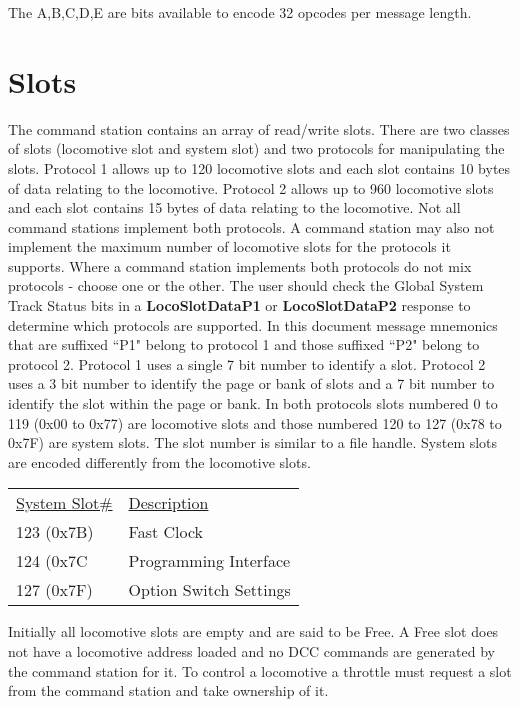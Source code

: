 The A,B,C,D,E are bits available to encode 32 opcodes per message length.

\section{Slots}

The command station contains an array of read/write slots. There are two classes of slots (\gls{locomotive slot} and \gls{system slot}) and two protocols for manipulating the slots. Protocol 1 allows up to 120 locomotive slots and each slot contains 10 bytes of data relating to the locomotive. Protocol 2 allows up to 960 locomotive slots and each slot contains 15 bytes of data relating to the locomotive. Not all command stations implement both protocols. A command station may also not implement the maximum number of locomotive slots for the protocols it supports. Where a command station implements both protocols do not mix protocols - choose one or the other. The user should check the \gls{Global System Track Status} bits in a \textbf{LocoSlotDataP1} or \textbf{LocoSlotDataP2} response to determine which protocols are supported. In this document message mnemonics that are suffixed ``P1" belong to protocol 1 and those suffixed ``P2" belong to protocol 2. Protocol 1 uses a single 7 bit number to identify a slot. Protocol 2 uses a 3 bit number to identify the page or bank of slots and a 7 bit number to identify the slot within the page or bank. In both protocols slots numbered 0 to 119 (0x00 to 0x77) are locomotive slots and those numbered 120 to 127 (0x78 to 0x7F) are system slots. The slot number is similar to a file handle. System slots are encoded differently from the locomotive slots. 

\begin{tabular}{l l}
\underline{System Slot\#} & \underline{Description}\\
123 (0x7B) & Fast Clock\\
124 (0x7C & Programming Interface\\
127 (0x7F) & Option Switch Settings\\
\end{tabular}

Initially all locomotive slots are empty and are said to be Free. A Free slot does not have a locomotive address loaded and no DCC commands are generated by the command station for it. To control a locomotive a \gls{throttle} must request a slot from the command station and take ownership of it.

